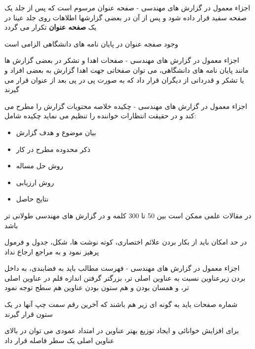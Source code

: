 \documentclass[14pt]{beamer}
\makeatletter
\newcommand{\rtlist}{\raggedleft\rightskip\@totalleftmargin}
\newcommand{\framefontsizelarge}{\fontsize{18pt}{0pt}\selectfont}
\newcommand{\frametitlefontsize}{\fontsize{20pt}{0pt}\selectfont}
\makeatother
\begin{document}
\begin{persian}
	\begin{frame}[plain]{\frametitlefontsize  اجزاء معمول در گزارش های مهندسی - صفحه عنوان}
		\framefontsizelarge
		مرسوم است که پس از جلد یک صفحه سفید قرار داده شود و پس از آن در بعضی گزارشها اطلاهات روی جلد عینا در یک \textbf{صفحه عنوان} تکرار می گردد
		
		وجود صفجه عنوان در پایان نامه های دانشگاهی الزامی است
	\end{frame}	
	
	\begin{frame}[plain]{\frametitlefontsize  اجزاء معمول در گزارش های مهندسی - صفحات اهدا و تشکر}
		\framefontsizelarge
		در بعضی گزارش ها مانند پایان نامه های دانشگاهی، می توان صفحاتی جهت اهدا گزارش به بعضی افراد و یا تشکر و قدردانی از دیگران قرار داد که به صورت پی در پی بعد از عنوان قرار می گیرند
	\end{frame}	
	
	\begin{frame}[plain]{\frametitlefontsize  اجزاء معمول در گزارش های مهندسی - چکیده}
		\framefontsizelarge
		خلاصه محتویات گزارش را مطرح می کند و در حقیقت انتظارات خواننده را تنظیم می نماید
		چکیده شامل:
		\begin{itemize}\rtlist
			\item بیان موضوع و هدف گزارش
			\item ذکر محدوده مطرح در کار
			\item روش حل مساله
			\item روش ارزیابی
			\item نتایج حاصل
		\end{itemize}
		
		در مقالات علمی ممکن است بین 50 تا 300 کلمه و در گزارش های مهندسی طولانی تر باشد
		
		در حد امکان باید از بکار بردن علائم اختصاری، کوته نوشت ها، شکل، جدول و فرمول پرهیز نمود و به مراجع ارجاع نداد
	\end{frame}	
	
	\begin{frame}[plain]{\frametitlefontsize  اجزاء معمول در گزارش های مهندسی - فهرست مطالب}
		\framefontsizelarge
		باید به فضابندی، به داخل بردن زیرعناوین نسبت به عناوین اصلی تر، بزرگتر گرفتن اندازه قلم در عناوین اصلی تر، و همسان بودن و هم ستون بودن عناوین هم سطح توجه نمود
		
		شماره صفحات باید به گونه ای زیر هم باشند که آخرین رقم سمت چپ آنها در یک ستون قرار گیرند
		
		برای افزایش خوانائی و ایجاد توزیع بهتر عناوین در امتداد عمودی می توان در بالای عناوین اصلی یک سطر فاصله قرار داد
		

\end{frame}
\end{persian}
\end{document}
